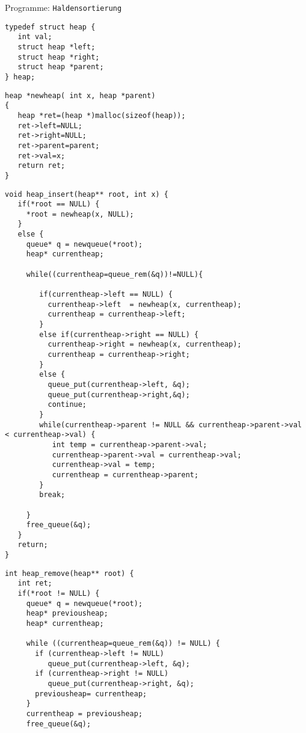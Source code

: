 \begin{myexampleprogram}{Programme: \texttt{Haldensortierung}}
\begin{lstlisting}
typedef struct heap {
   int val;
   struct heap *left;
   struct heap *right;
   struct heap *parent;
} heap;
\end{lstlisting}
\begin{lstlisting}
heap *newheap( int x, heap *parent)
{
   heap *ret=(heap *)malloc(sizeof(heap));
   ret->left=NULL;
   ret->right=NULL;
   ret->parent=parent;
   ret->val=x;
   return ret;
}
\end{lstlisting}
\begin{lstlisting}
void heap_insert(heap** root, int x) {
   if(*root == NULL) {
     *root = newheap(x, NULL);
   }
   else {
     queue* q = newqueue(*root);
     heap* currentheap;

     while((currentheap=queue_rem(&q))!=NULL){

        if(currentheap->left == NULL) {
          currentheap->left  = newheap(x, currentheap);
          currentheap = currentheap->left;
        }
        else if(currentheap->right == NULL) {
          currentheap->right = newheap(x, currentheap);
          currentheap = currentheap->right;
        }
        else {
          queue_put(currentheap->left, &q);
          queue_put(currentheap->right,&q);
          continue;
        }
        while(currentheap->parent != NULL && currentheap->parent->val < currentheap->val) {
           int temp = currentheap->parent->val;
           currentheap->parent->val = currentheap->val;
           currentheap->val = temp;
           currentheap = currentheap->parent;
        }
        break;

     }
     free_queue(&q);
   }
   return;
}
\end{lstlisting}
\begin{lstlisting}
int heap_remove(heap** root) {
   int ret;
   if(*root != NULL) {
     queue* q = newqueue(*root);
     heap* previousheap;
     heap* currentheap;

     while ((currentheap=queue_rem(&q)) != NULL) {
       if (currentheap->left != NULL)
          queue_put(currentheap->left, &q);
       if (currentheap->right != NULL)
          queue_put(currentheap->right, &q);
       previousheap= currentheap;
     }
     currentheap = previousheap;
     free_queue(&q);


\end{lstlisting}
\end{myexampleprogram}
